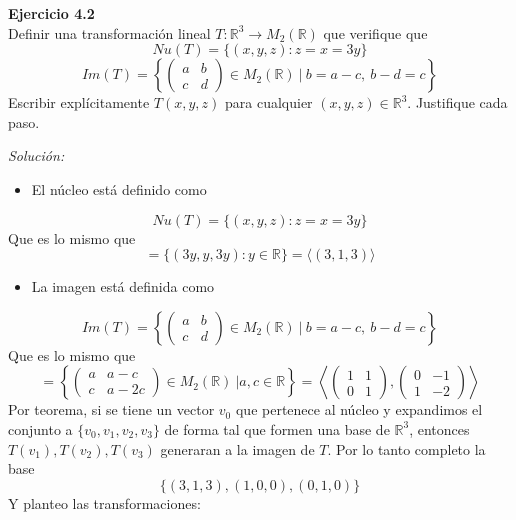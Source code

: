 \documentclass{article}
\newenvironment{problem}[2][Ejercicio]
    { \begin{mdframed}[backgroundcolor=gray!20] \textbf{#1 #2} \\}
    {  \end{mdframed}}
\newenvironment{solution}
    {\textit{Solución:}}
    {}
\begin{document}
\begin{problem}{4.2}
    Definir una transformación lineal $T:\mathbb{R}^3 \to M_2(\mathbb{R})$ que verifique que
\[
Nu(T) = \{ (x,y,z) : z = x = 3y \}
\]\[
Im(T) = \left \{  \begin{pmatrix} a & b \\ c & d \end{pmatrix}  \in M_2(\mathbb{R}) \ | \ b=a-c, \ b-d = c \right \}
\]
Escribir explícitamente $T(x,y,z)$ para cualquier $(x,y,z) \in \mathbb{R}^3$. Justifique cada paso.
\end{problem}
\begin{solution}
    \begin{itemize}
        \item 
        El núcleo está definido como
        \end{itemize}
        \[
        Nu(T) = \{ (x,y,z) : z = x = 3y \}
        \]
        Que es lo mismo que
        \[
        = \{ (3y,y,3y) : y \in \mathbb{R} \} = \langle (3,1,3) \rangle
        \]\begin{itemize}
        \item 
        La imagen está definida como
        \end{itemize}
        \[
        Im(T) = \left \{  \begin{pmatrix} a & b \\ c & d \end{pmatrix}  \in M_2(\mathbb{R}) \ | \ b=a-c, \ b-d = c \right \}
        \]
        Que es lo mismo que
        \[
        = \left \{  \begin{pmatrix} a & a-c \\ c & a-2c \end{pmatrix}  \in M_2(\mathbb{R}) \ | a,c \in \mathbb{R} \right \} = \left \langle  \begin{pmatrix} 1 & 1 \\ 0 & 1 \end{pmatrix}, \begin{pmatrix} 0 & -1 \\ 1 & -2 \end{pmatrix} \right \rangle
        \]
        Por teorema, si se tiene un vector $v_0$ que pertenece al núcleo y expandimos el conjunto a $\{v_0, v_1, v_2, v_3 \}$ de forma tal que formen una base de $\mathbb{R}^3$, entonces $T(v_1), T(v_2), T(v_3)$ generaran a la imagen de $T$.
        Por lo tanto completo la base
        \[
        \{ (3,1,3), (1,0,0), (0,1,0) \}
        \]
        Y planteo las transformaciones:
        \begin{itemize}

\end{itemize}
\end{solution}
\end{document}
